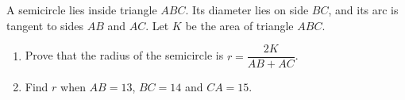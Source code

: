 A semicircle lies inside triangle $ABC$. Its diameter lies on side $BC$, and its arc is tangent to sides $AB$ and $AC$. Let $K$ be the area of triangle $ABC$.
\begin{enumerate}
\item[(a)] Prove that the radius of the semicircle is $r=\dfrac{2K}{AB+AC}$.
\item[(b)] Find $r$ when $AB=13$, $BC=14$ and $CA=15$.
\end{enumerate}
